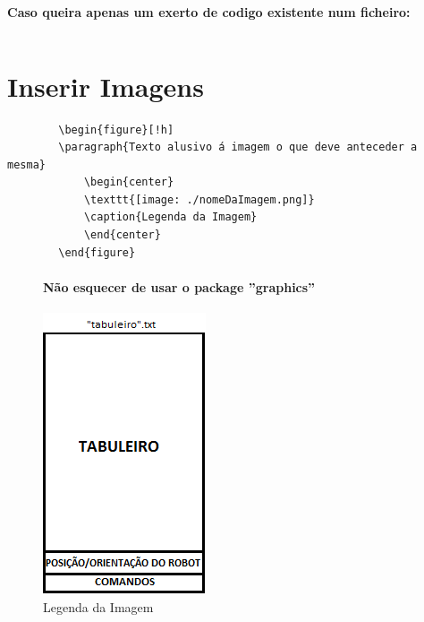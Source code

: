 \documentclass[a4paper,11pt]{report}%
\begin{document}
\paragraph{\ \ }\textbf{Caso queira apenas um exerto de codigo existente num ficheiro:}
\begin{verbatim}

\end{verbatim}


\newpage
\section{Inserir Imagens}
\begin{verbatim}
        \begin{figure}[!h]
		\paragraph{Texto alusivo á imagem o que deve anteceder a mesma}
        	\begin{center}
            \texttt{[image: ./nomeDaImagem.png]}
            \caption{Legenda da Imagem}
            \end{center}
        \end{figure}
\end{verbatim}



\begin{figure}[!h]
\paragraph{\textbf{Não esquecer de usar o package ''graphics''}}
    \begin{center}
    \includegraphics[scale=0.6]{./imagemdeteste.png}
    \caption{Legenda da Imagem}
    \end{center}
\end{figure}
\end{document}
